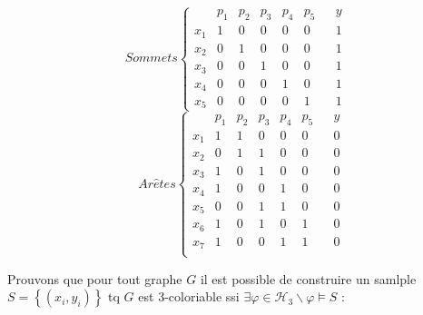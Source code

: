 \documentclass{article}
\begin{document}
    \begin{minipage}[c]{0.45\linewidth}
        \begin{equation*}
            Sommets \left\{
        \begin{array}{cccccccc}
        & p_1 & p_2 & p_3 & p_4 & p_5 && y\\
        x_1 & 1 & 0 & 0 & 0 & 0 & & 1\\
        x_2 & 0 & 1 & 0 & 0 & 0 & & 1\\
        x_3 & 0 & 0 & 1 & 0 & 0 & & 1\\
        x_4 & 0 & 0 & 0 & 1 & 0 & & 1\\
        x_5 & 0 & 0 & 0 & 0 & 1 & & 1
        \end{array} \right.
        \end{equation*}
        \begin{equation*}
        ~~~~Ar\hat{e}tes \left\{
        \begin{array}{cccccccc}
        & p_1 & p_2 & p_3 & p_4 & p_5 && y\\
        x_1 & 1 & 1 & 0 & 0 & 0 & & 0\\
        x_2 & 0 & 1 & 1 & 0 & 0 & & 0\\
        x_3 & 1 & 0 & 1 & 0 & 0 & & 0\\
        x_4 & 1 & 0 & 0 & 1 & 0 & & 0\\
        x_5 & 0 & 0 & 1 & 1 & 0 & & 0\\
        x_6 & 1 & 0 & 1 & 0 & 1 & & 0\\
        x_7 & 1 & 0 & 0 & 1 & 1 & & 0\\
        \end{array} \right.
        \end{equation*}
    \end{minipage}

    Prouvons que pour tout graphe $G$ il est possible de construire un samlple
    $S = \left\{(x_i, y_i)\right\}$ tq $G$ est 3-coloriable ssi $\exists \varphi \in \mathcal{H}_3 \backslash \varphi \models S$ :
\end{document}
